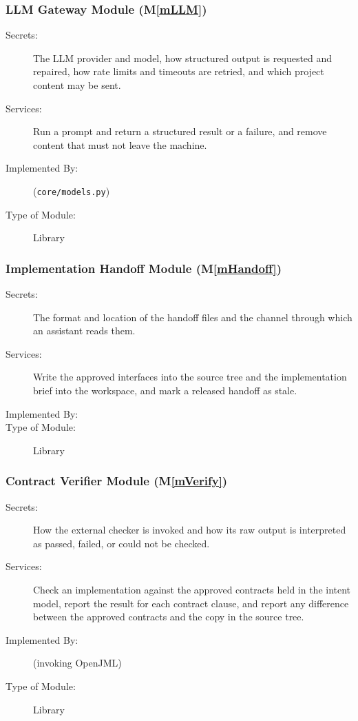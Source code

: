 \documentclass[12pt, titlepage]{article}
\newcommand{\mref}[1]{M\ref{#1}}
\begin{document}
\subsubsection{LLM Gateway Module (\mref{mLLM})}

\begin{description}
\item[Secrets:]The LLM provider and model, how structured output is requested
  and repaired, how rate limits and timeouts are retried, and which project
  content may be sent.
\item[Services:]Run a prompt and return a structured result or a failure,
  and remove content that must not leave the machine.
\item[Implemented By:] \progname{} (\texttt{core/models.py})
\item[Type of Module:] Library
\end{description}

\subsubsection{Implementation Handoff Module (\mref{mHandoff})}

\begin{description}
\item[Secrets:]The format and location of the handoff files and the channel
  through which an assistant reads them.
\item[Services:]Write the approved interfaces into the source tree and the
  implementation brief into the workspace, and mark a released handoff as
  stale.
\item[Implemented By:] \progname{}
\item[Type of Module:] Library
\end{description}

\subsubsection{Contract Verifier Module (\mref{mVerify})}

\begin{description}
\item[Secrets:]How the external checker is invoked and how its raw output is
  interpreted as passed, failed, or could not be checked.
\item[Services:]Check an implementation against the approved contracts held in
  the intent model, report the result for each contract clause, and report any
  difference between the approved contracts and the copy in the source tree.
\item[Implemented By:] \progname{} (invoking OpenJML)
\item[Type of Module:] Library
\end{description}
\end{document}
